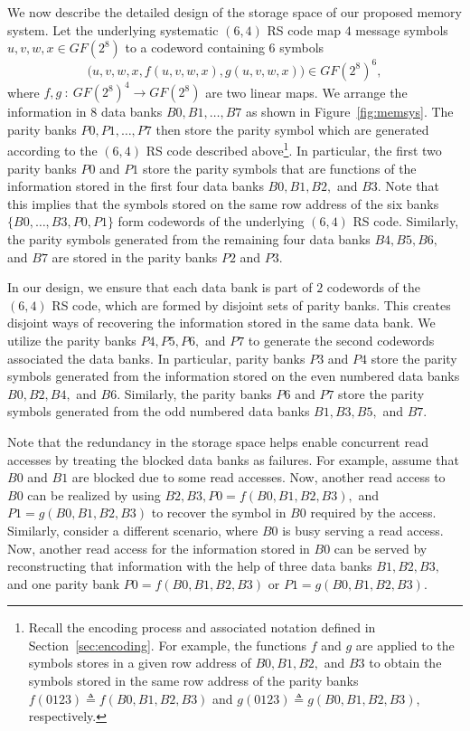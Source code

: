 We now describe the detailed design of the storage space of our proposed memory system. Let the underlying systematic $(6,4)$ RS code map $4$ message symbols $u, v, w, x \in GF(2^{8})$ to a codeword containing $6$ symbols 
$$
\big(u, v, w, x, f(u, v, w, x), g(u, v, w, x)\big) \in GF(2^{8})^6,
$$
where $f, g~:~GF(2^{8})^4 \to GF(2^{8})$ are two linear maps. We arrange the information in $8$ data banks $B0, B1, \ldots, B7$ as shown in Figure~\ref{fig:memsys}. The parity banks $P0, P1,\ldots, P7$ then store the parity symbol which are generated according to the $(6,4)$ RS code described above\footnote{Recall the encoding process and associated notation defined in Section~\ref{sec:encoding}. For example, the functions $f$ and $g$ are applied to the symbols stores in a given row address of $B0, B1, B2,$ and $B3$ to obtain the symbols stored in the same row address of the parity banks $f(0123) \triangleq f(B0,B1,B2,B3)$ and $g(0123) \triangleq g(B0, B1, B2, B3)$, respectively.}. In particular, the first two parity banks $P0$ and $P1$ store the parity symbols that are functions of the information stored in the first four data banks $B0, B1, B2,$ and $B3$. Note that this implies that the symbols stored on the same row address of the six banks $\{B0,\ldots, B3, P0,P1\}$ form codewords of the underlying $(6,4)$ RS code. Similarly, the parity symbols generated from the remaining four data banks $B4, B5, B6,$ and $B7$ are stored in the parity banks $P2$ and $P3$. 

In our design, we ensure that each data bank is part of $2$ codewords of the $(6,4)$ RS code, which are formed by disjoint sets of parity banks. This creates disjoint ways of recovering the information stored in the same data bank. We utilize the parity banks $P4, P5, P6,$ and $P7$ to generate the second codewords associated the data banks. In particular, parity banks $P3$ and $P4$ store the parity symbols generated from the information stored on the even numbered data banks $B0, B2, B4,$ and $B6$. Similarly, the parity banks $P6$ and $P7$ store the parity symbols generated from the odd numbered data banks $B1, B3, B5,$ and $B7$. 

\begin{remark}
\label{rem:degraded}
Note that the redundancy in the storage space helps enable concurrent read accesses by treating the blocked data banks as failures. For example, assume that $B0$ and $B1$ are blocked due to some read accesses. Now, another read access to $B0$ can be realized by using $B2, B3, P0 = f(B0, B1, B2, B3),$ and $P1 = g(B0, B1, B2, B3)$ to recover the symbol in $B0$ required by the access. Similarly, consider a different scenario, where $B0$ is busy serving a read access. Now, another read access for the information stored in $B0$ can be served by reconstructing that information with the help of three data banks $B1, B2, B3,$ and one parity bank $P0 = f(B0, B1, B2, B3)$ or $P1 = g(B0, B1, B2, B3)$.
\end{remark}

